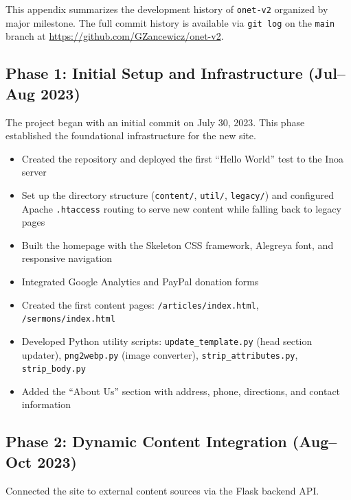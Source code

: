 \documentclass[12pt]{article}
\begin{document}
This appendix summarizes the development history of \texttt{onet-v2} organized by major milestone. The full commit history is available via \texttt{git log} on the \texttt{main} branch at \url{https://github.com/GZancewicz/onet-v2}.

\subsection{Phase 1: Initial Setup and Infrastructure (Jul--Aug 2023)}

The project began with an initial commit on July 30, 2023. This phase established the foundational infrastructure for the new site.

\begin{itemize}
    \item Created the repository and deployed the first ``Hello World'' test to the Inoa server
    \item Set up the directory structure (\texttt{content/}, \texttt{util/}, \texttt{legacy/}) and configured Apache \texttt{.htaccess} routing to serve new content while falling back to legacy pages
    \item Built the homepage with the Skeleton CSS framework, Alegreya font, and responsive navigation
    \item Integrated Google Analytics and PayPal donation forms
    \item Created the first content pages: \texttt{/articles/index.html}, \texttt{/sermons/index.html}
    \item Developed Python utility scripts: \texttt{update\_template.py} (head section updater), \texttt{png2webp.py} (image converter), \texttt{strip\_attributes.py}, \texttt{strip\_body.py}
    \item Added the ``About Us'' section with address, phone, directions, and contact information
\end{itemize}

\subsection{Phase 2: Dynamic Content Integration (Aug--Oct 2023)}

Connected the site to external content sources via the Flask backend API.
\end{document}
